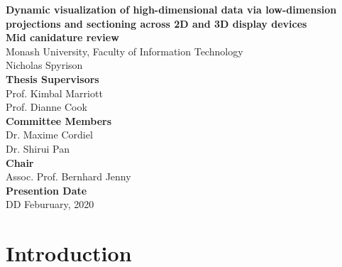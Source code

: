 \documentclass[11,]{article}
\author{}
\date{\vspace{-2.5em}}
\theoremstyle{definition}
\theoremstyle{definition}
\theoremstyle{definition}
\theoremstyle{remark}
\begin{document}

\onehalfspacing
{}

\begin{center}
\LARGE{\textbf{Dynamic visualization of high-dimensional data via
low-dimension projections and sectioning across 2D and 3D display devices}}\\
\vspace*{2\baselineskip}
\Large{\textbf{Mid canidature review}}\\
\normalsize{Monash University, Faculty of Information Technology}\\
\vspace*{2\baselineskip}
\Large{Nicholas Spyrison}\\ %
\vspace*{3\baselineskip}
\Large{\textbf{Thesis Supervisors}}\\
Prof. Kimbal Marriott\\
Prof. Dianne Cook\\
\vspace*{2\baselineskip}
\Large{\textbf{Committee Members}}\\
Dr. Maxime Cordiel\\
Dr. Shirui Pan\\
\vspace*{1\baselineskip}
\Large{\textbf{Chair}}\\
Assoc. Prof. Bernhard Jenny\\
\vspace*{1\baselineskip}
\Large{\textbf{Presention Date}}\\
DD Feburuary, 2020
\end{center}

\doublespacing

\hypersetup{linkcolor = blue}
\newpage
{}
\tableofcontents
{}

\newpage

% 

\doublespacing

\newpage
{}
\hypersetup{linkcolor = blue}

{
\hypersetup{linkcolor=black}
\setcounter{tocdepth}{2}
\tableofcontents
}
\section{Introduction}\label{sec:intro}
\end{document}
